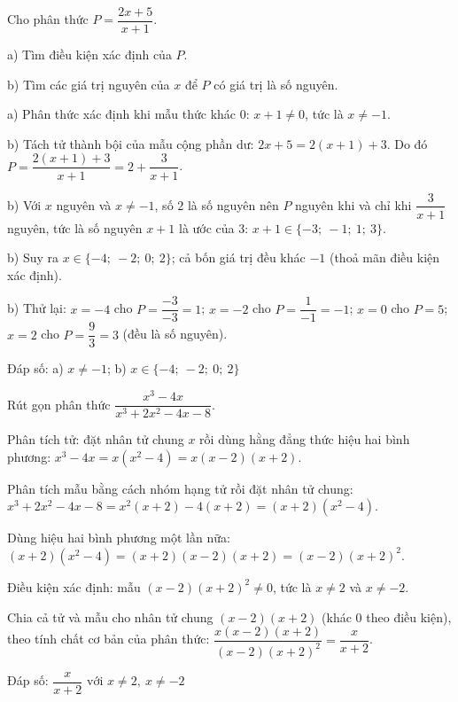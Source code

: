 \begin{problem}[8DS-PS-042]
Cho phân thức $P = \dfrac{2x + 5}{x + 1}$.

a) Tìm điều kiện xác định của $P$.

b) Tìm các giá trị nguyên của $x$ để $P$ có giá trị là số nguyên.

\begin{solution}
a) Phân thức xác định khi mẫu thức khác $0$: $x + 1 \neq 0$, tức là $x \neq -1$.

b) Tách tử thành bội của mẫu cộng phần dư: $2x + 5 = 2(x + 1) + 3$. Do đó $P = \dfrac{2(x + 1) + 3}{x + 1} = 2 + \dfrac{3}{x + 1}$.

b) Với $x$ nguyên và $x \neq -1$, số $2$ là số nguyên nên $P$ nguyên khi và chỉ khi $\dfrac{3}{x + 1}$ nguyên, tức là số nguyên $x + 1$ là ước của $3$: $x + 1 \in \{-3;\ -1;\ 1;\ 3\}$.

b) Suy ra $x \in \{-4;\ -2;\ 0;\ 2\}$; cả bốn giá trị đều khác $-1$ (thoả mãn điều kiện xác định).

b) Thử lại: $x = -4$ cho $P = \dfrac{-3}{-3} = 1$; $x = -2$ cho $P = \dfrac{1}{-1} = -1$; $x = 0$ cho $P = 5$; $x = 2$ cho $P = \dfrac{9}{3} = 3$ (đều là số nguyên).

Đáp số: a) $\boxed{x \neq -1}$; b) $\boxed{x \in \{-4;\ -2;\ 0;\ 2\}}$
\end{solution}
\end{problem}

\begin{problem}[8DS-PS-043]
Rút gọn phân thức $\dfrac{x^3 - 4x}{x^3 + 2x^2 - 4x - 8}$.

\begin{solution}
Phân tích tử: đặt nhân tử chung $x$ rồi dùng hằng đẳng thức hiệu hai bình phương: $x^3 - 4x = x(x^2 - 4) = x(x - 2)(x + 2)$.

Phân tích mẫu bằng cách nhóm hạng tử rồi đặt nhân tử chung: $x^3 + 2x^2 - 4x - 8 = x^2(x + 2) - 4(x + 2) = (x + 2)(x^2 - 4)$.

Dùng hiệu hai bình phương một lần nữa: $(x + 2)(x^2 - 4) = (x + 2)(x - 2)(x + 2) = (x - 2)(x + 2)^2$.

Điều kiện xác định: mẫu $(x - 2)(x + 2)^2 \neq 0$, tức là $x \neq 2$ và $x \neq -2$.

Chia cả tử và mẫu cho nhân tử chung $(x - 2)(x + 2)$ (khác $0$ theo điều kiện), theo tính chất cơ bản của phân thức: $\dfrac{x(x - 2)(x + 2)}{(x - 2)(x + 2)^2} = \dfrac{x}{x + 2}$.

Đáp số: $\boxed{\dfrac{x}{x + 2} \text{ với } x \neq 2,\ x \neq -2}$
\end{solution}
\end{problem}

